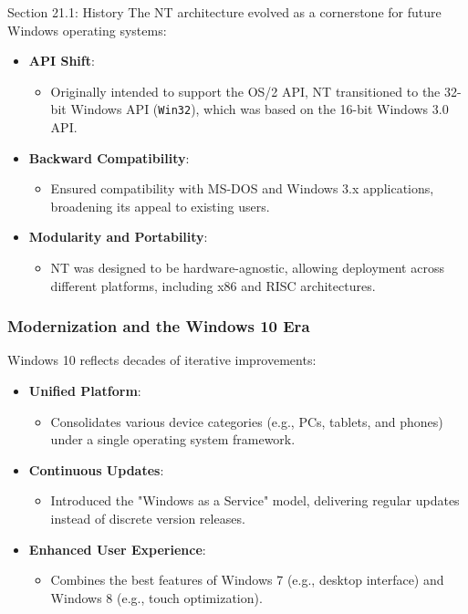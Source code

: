 \begin{notes}{Section 21.1: History}
    The NT architecture evolved as a cornerstone for future Windows operating systems:
    \begin{itemize}
        \item \textbf{API Shift}:
        \begin{itemize}
            \item Originally intended to support the OS/2 API, NT transitioned to the 32-bit Windows API (\texttt{Win32}), which was based on the 16-bit Windows 3.0 API.
        \end{itemize}
        \item \textbf{Backward Compatibility}:
        \begin{itemize}
            \item Ensured compatibility with MS-DOS and Windows 3.x applications, broadening its appeal to existing users.
        \end{itemize}
        \item \textbf{Modularity and Portability}:
        \begin{itemize}
            \item NT was designed to be hardware-agnostic, allowing deployment across different platforms, including x86 and RISC architectures.
        \end{itemize}
    \end{itemize}
    
    \subsubsection*{Modernization and the Windows 10 Era}
    
    Windows 10 reflects decades of iterative improvements:
    \begin{itemize}
        \item \textbf{Unified Platform}:
        \begin{itemize}
            \item Consolidates various device categories (e.g., PCs, tablets, and phones) under a single operating system framework.
        \end{itemize}
        \item \textbf{Continuous Updates}:
        \begin{itemize}
            \item Introduced the "Windows as a Service" model, delivering regular updates instead of discrete version releases.
        \end{itemize}
        \item \textbf{Enhanced User Experience}:
        \begin{itemize}
            \item Combines the best features of Windows 7 (e.g., desktop interface) and Windows 8 (e.g., touch optimization).
        \end{itemize}
    \end{itemize}
    

\end{notes}
